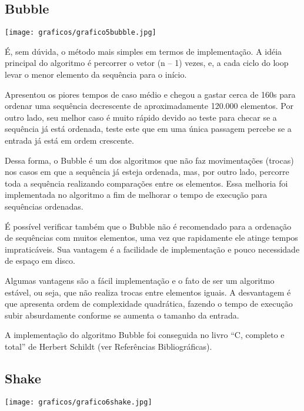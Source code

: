 \documentclass[12pt,a4paper]{article}
\begin{document}
\subsection{Bubble}
\begin{center}
\texttt{[image: graficos/grafico5bubble.jpg]}
\end{center}

É, sem dúvida, o método mais simples em termos de implementação. A idéia principal do algoritmo é percorrer o vetor (n – 1) vezes, e, a cada ciclo do loop levar o menor elemento da sequência para o início. 

Apresentou os piores tempos de caso médio e chegou a gastar cerca de 160s para ordenar uma sequência decrescente de aproximadamente 120.000 elementos. Por outro lado, seu melhor caso é muito rápido devido ao teste para checar se a sequência já está ordenada, teste este que em uma única passagem percebe se a entrada já está em ordem crescente.

Dessa forma, o Bubble é um dos algoritmos que não faz movimentações (trocas) nos casos em que a sequência já esteja ordenada, mas, por outro lado, percorre toda a sequência realizando comparações entre os elementos. Essa melhoria foi implementada no algoritmo a fim de melhorar o tempo de execução para sequências ordenadas.

É possível verificar também que o Bubble não é recomendado para a ordenação de sequências com muitos elementos, uma vez que rapidamente ele atinge tempos impraticáveis. Sua vantagem é a facilidade de implementação e pouco necessidade de espaço em disco.

Algumas vantagens são a fácil implementação e o fato de ser um algoritmo estável, ou seja, que não realiza trocas entre elementos iguais. A desvantagem é que apresenta ordem de complexidade quadrática, fazendo o tempo de execução subir absurdamente conforme se aumenta o tamanho da entrada.

A implementação do algoritmo Bubble foi conseguida no livro “C, completo e total” de Herbert Schildt (ver Referências Bibliográficas).






\subsection{Shake}
\begin{center}
\texttt{[image: graficos/grafico6shake.jpg]}
\end{center}
\end{document}
